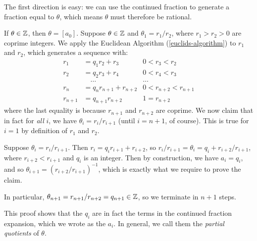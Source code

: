\documentclass{article}
\begin{document}
\begin{prf}
    The first direction is easy: we can use the continued fraction to generate a fraction equal to $\theta$, which means $\theta$ must therefore be rational.
    
    If $\theta \in \mathbb{Z}$, then $\theta = [a_0]$. Suppose $\theta \in \mathbb{Z}$ and $\theta_1 = r_1/r_2$, where $r_1 > r_2 > 0$ are coprime integers. We apply the Euclidean Algorithm (\ref{euclids-algorithm}) to $r_1$ and $r_2$, which generates a sequence with:
    \begin{align*}
	    r_1 &= q_1 r_2 + r_3 & 0 < r_3 < r_2 \\
	    r_2 &= q_2 r_3 + r_4 & 0 < r_4 < r_3 \\
	    & \quad \dots & \dots \qquad \\
	    r_n &= q_n r_{n+1} + r_{n+2} & 0 < r_{n+2} < r_{n+1} \!\!\!\!\!\!\!\!\! \\
	    r_{n+1} &= q_{n+1} r_{n+2} & 1 = r_{n+2}
	\end{align*}
	where the last equality is because $r_{n+1}$ and $r_{n+2}$ are coprime. We now claim that in fact for \textit{all} $i$, we have $\theta_i = r_i/r_{i+1}$ (until $i = n+1$, of course). This is true for $i = 1$ by definition of $r_1$ and $r_2$.
	
	Suppose $\theta_i = r_i/r_{i+1}$. Then $r_i = q_i r_{i+1} + r_{i+2}$, so $r_i/r_{i+1} = \theta_i = q_i + r_{i+2}/r_{i+1}$, where $r_{i+2} <r_{i+1}$ and $q_i$ is an integer. Then by construction, we have $a_i = q_i$, and so $\theta_{i+1} = (r_{i+2} / r_{i+1})^{-1}$, which is exactly what we require to prove the claim.
	
	In particular, $\theta_{n+1} = r_{n+1}/r_{n+2} = q_{n+1} \in \mathbb{Z}$, so we terminate in $n+1$ steps.
\end{prf}

\begin{corollary}
    This proof shows that the $q_i$ are in fact the terms in the continued fraction expansion, which we wrote as the $a_i$. In general, we call them the \textit{partial quotients} of $\theta$.
\end{corollary}
\end{document}
